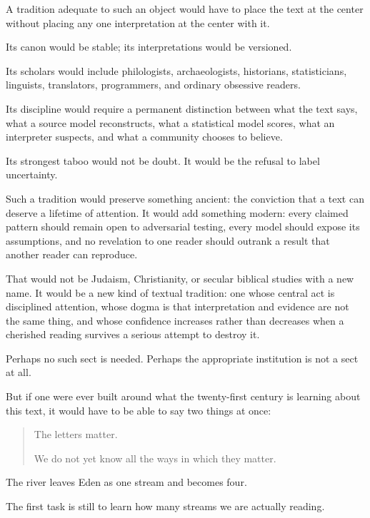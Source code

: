 A tradition adequate to such an object would have to place the text at the center without placing any one interpretation at the center with it.

Its canon would be stable; its interpretations would be versioned.

Its scholars would include philologists, archaeologists, historians, statisticians, linguists, translators, programmers, and ordinary obsessive readers.

Its discipline would require a permanent distinction between what the text says, what a source model reconstructs, what a statistical model scores, what an interpreter suspects, and what a community chooses to believe.

Its strongest taboo would not be doubt.  It would be the refusal to label uncertainty.

Such a tradition would preserve something ancient: the conviction that a text can deserve a lifetime of attention.  It would add something modern: every claimed pattern should remain open to adversarial testing, every model should expose its assumptions, and no revelation to one reader should outrank a result that another reader can reproduce.

That would not be Judaism, Christianity, or secular biblical studies with a new name.  It would be a new kind of textual tradition: one whose central act is disciplined attention, whose dogma is that interpretation and evidence are not the same thing, and whose confidence increases rather than decreases when a cherished reading survives a serious attempt to destroy it.

Perhaps no such sect is needed.  Perhaps the appropriate institution is not a sect at all.

But if one were ever built around what the twenty-first century is learning about this text, it would have to be able to say two things at once:

\begin{quote}
The letters matter.

We do not yet know all the ways in which they matter.
\end{quote}

The river leaves Eden as one stream and becomes four.

The first task is still to learn how many streams we are actually reading.

